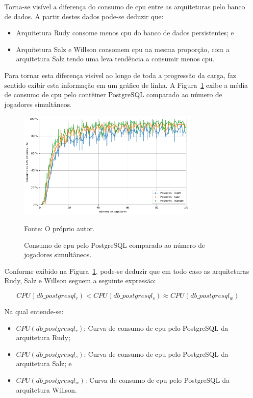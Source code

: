 Torna-se visível a diferença do consumo de \ac{cpu} entre as arquiteturas pelo banco de dados.
%
A partir destes dados pode-se deduzir que:

\begin{itemize}
 \item Arquitetura Rudy consome menos \ac{cpu} do banco de dados persistentes; e 
 \item Arquitetura Salz e Willson consomem \ac{cpu} na mesma proporção, com a arquitetura Salz tendo uma leva tendência a consumir menos \ac{cpu}.
\end{itemize}

Para tornar esta diferença visível ao longo de toda a progressão da carga, faz sentido exibir esta informação em um gráfico de linha.
%
A Figura~\ref{fig:cpu_db_media_por_jogador} exibe a média de consumo de \ac{cpu} pelo contêiner PostgreSQL comparado ao número de jogadores simultâneos.

\begin{figure}[htb!]
  \caption{Consumo de \ac{cpu} pelo PostgreSQL comparado ao número de jogadores simultâneos.}
  \label{fig:cpu_db_media_por_jogador}
  \includegraphics[width=0.8\textwidth]{figuras/analise/cpu_db_media_por_jogador.png}
  \centering

  Fonte: O próprio autor.
\end{figure}

Conforme exibido na Figura~\ref{fig:cpu_db_media_por_jogador}, pode-se deduzir que em todo caso as arquiteturas Rudy, Salz e Willson seguem a seguinte expressão:

$$
    CPU(db\_postgresql_{r}) < CPU(db\_postgresql_{s}) \approx CPU(db\_postgresql_{w})
$$

Na qual entende-se:

\begin{itemize}
\item $CPU(db\_postgresql_{r})$: Curva de consumo de \ac{cpu} pelo PostgreSQL da arquitetura Rudy;
\item $CPU(db\_postgresql_{s})$: Curva de consumo de \ac{cpu} pelo PostgreSQL da arquitetura Salz; e
\item $CPU(db\_postgresql_{w})$: Curva de consumo de \ac{cpu} pelo PostgreSQL da arquitetura Willson.
\end{itemize}

